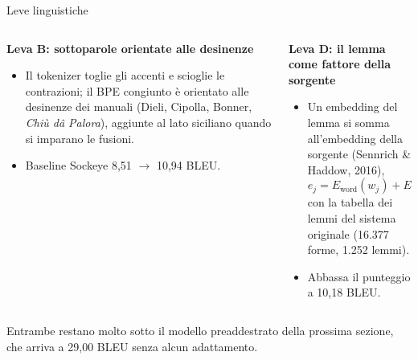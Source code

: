 \documentclass[aspectratio=169]{beamer}
\newcommand{\T}[2]{#2}
\newcommand{\T}[2]{#1}
\begin{document}
\begin{frame}{\T{Linguistic levers}{Leve linguistiche}}
  \begin{columns}[t]
    \begin{column}{0.5\textwidth}
      \textbf{\T{Lever B: desinence-biased subwords}{Leva B: sottoparole orientate alle desinenze}}
      \begin{itemize}
        \footnotesize
        \item \T{The tokenizer ASCII-folds and uncontracts; the joint BPE is biased toward the
              textbook desinences (Dieli, Cipolla, Bonner, \emph{Chi\`u d\^a Palora}), which are
              appended to the Sicilian side when the merges are learned.}%
              {Il tokenizer toglie gli accenti e scioglie le contrazioni; il BPE congiunto \`e
              orientato alle desinenze dei manuali (Dieli, Cipolla, Bonner, \emph{Chi\`u d\^a
              Palora}), aggiunte al lato siciliano quando si imparano le fusioni.}
        \item \T{Sockeye baseline 8.51 $\to$ 10.94 BLEU.}{Baseline Sockeye 8,51 $\to$ 10,94 BLEU.}
      \end{itemize}
    \end{column}
    \begin{column}{0.5\textwidth}
      \textbf{\T{Lever D: lemma source factor}{Leva D: il lemma come fattore della sorgente}}
      \begin{itemize}
        \footnotesize
        \item \T{A lemma embedding is summed into the source embedding (Sennrich \& Haddow,
              2016),}%
              {Un embedding del lemma si somma all'embedding della sorgente (Sennrich \& Haddow,
              2016),}
              \[ e_j=E_{\text{word}}(w_j)+E_{\text{lemma}}(\ell_j), \]
              \T{with the lemma table of the original system (16,377 forms, 1,252 lemmas).}%
              {con la tabella dei lemmi del sistema originale (16.377 forme, 1.252 lemmi).}
        \item \T{It lowers the score to 10.18 BLEU.}{Abbassa il punteggio a 10,18 BLEU.}
      \end{itemize}
    \end{column}
  \end{columns}
  \vfill
  {\footnotesize\color{gray} \T{Both stay far below the pretrained model of the next section,
  which reaches 29.00 BLEU without any adaptation.}%
  {Entrambe restano molto sotto il modello preaddestrato della prossima sezione, che arriva a
  29,00 BLEU senza alcun adattamento.}}
\end{frame}
\end{document}
